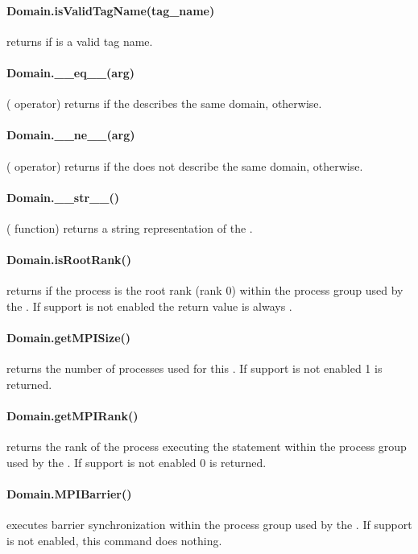 %
\paragraph{Domain.isValidTagName(tag_name)}
returns \True if  is a valid tag name.

%
\paragraph{Domain.__eq__(arg)}
(\PYTHON \var{==} operator) returns \True if the \Domain {}
    describes the same domain, \False otherwise.

%
\paragraph{Domain.__ne__(arg)}
(\PYTHON \var{!=} operator) returns \True if the \Domain {} does
    not describe the same domain, \False otherwise.

%
\paragraph{Domain.__str__()}
(\PYTHON {} function) returns a string representation of the
    \Domain.

%
\paragraph{Domain.isRootRank()}
returns \True if the process is the root rank (rank 0) within the \MPI
    process group used by the \Domain.
    If \MPI support is not enabled the return value is always \True.

%
\paragraph{Domain.getMPISize()}
returns the number of \MPI processes used for this \Domain. If \MPI
    support is not enabled 1 is returned.

%
\paragraph{Domain.getMPIRank()}
returns the rank of the process executing the statement within the
    \MPI process group used by the \Domain. If \MPI support is not enabled
    0 is returned.

%
\paragraph{Domain.MPIBarrier()}
executes barrier synchronization within the \MPI process group used by
    the \Domain. If \MPI support is not enabled, this command does nothing.



